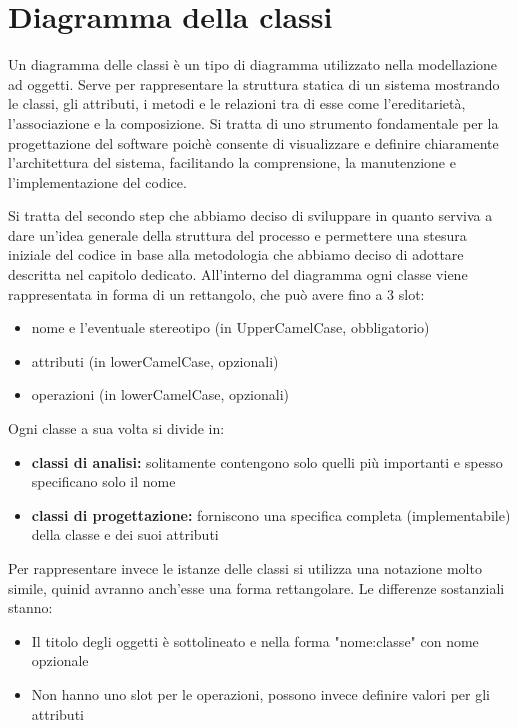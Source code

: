 \documentclass[a4paper, 11pt,oneside]{book}
\newcommand{\spacing}{\par\bigskip\noindent}
\begin{document}
\chapter{Diagramma della classi}
    Un diagramma delle classi è un tipo di diagramma utilizzato nella modellazione ad oggetti. Serve per rappresentare la struttura statica di un sistema mostrando le classi, gli attributi, i metodi
    e le relazioni tra di esse come l'ereditarietà, l'associazione e la composizione. Si tratta di uno strumento fondamentale per la progettazione del software poichè consente di visualizzare e definire
    chiaramente l'architettura del sistema, facilitando la comprensione, la manutenzione e l'implementazione del codice.
    \spacing
    Si tratta del secondo step che abbiamo deciso di sviluppare in quanto serviva a dare un'idea generale della struttura del processo e permettere una stesura iniziale del codice in base alla metodologia che abbiamo deciso di adottare descritta nel capitolo dedicato. 
    All'interno del diagramma ogni classe viene rappresentata in forma di un rettangolo, che può avere fino a 3 slot:
    \begin{itemize}
        \item nome e l'eventuale stereotipo (in UpperCamelCase, obbligatorio)
        \item attributi (in lowerCamelCase, opzionali)
        \item operazioni (in lowerCamelCase, opzionali)
    \end{itemize}
    Ogni classe a sua volta si divide in:
    \begin{itemize}
        \item \textbf{classi di analisi:} solitamente contengono solo quelli più importanti e spesso specificano solo il nome
        \item \textbf{classi di progettazione:} forniscono una specifica completa (implementabile) della classe e dei suoi attributi
    \end{itemize}
    Per rappresentare invece le istanze delle classi si utilizza una notazione molto simile, quinid avranno anch'esse una forma rettangolare. Le differenze sostanziali stanno:
    \begin{itemize}
        \item Il titolo degli oggetti è sottolineato e nella forma "nome:classe" con nome opzionale
        \item Non hanno uno slot per le operazioni, possono invece definire valori per gli attributi
    \end{itemize}
\end{document}
